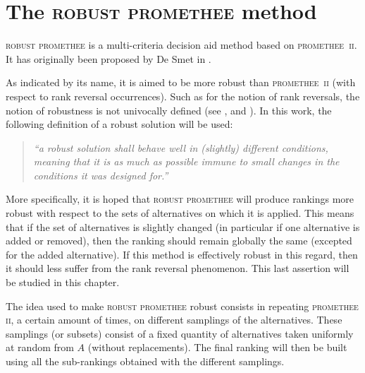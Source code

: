 \chapter{The \textsc{robust promethee} method} \label{sec:Robust_Promethee}
\label{chap:robst}

\begin{sloppypar}
\textsc{robust promethee} is a multi-criteria decision aid method based on \mbox{\textsc{promethee ii}}.
It has originally been proposed by De Smet in \cite{RobPII}.
\end{sloppypar}


As indicated by its name, it is aimed to be more robust than \mbox{\textsc{promethee ii}} (with respect to rank reversal occurrences). 
Such as for the notion of rank reversals, the notion of robustness is not univocally defined (see \cite{Roy2010629}, \cite{Hites2006322} and \cite{barrico2006robustness}).
In this work, the following definition of a robust solution will be used:
\begin{quote}
    \textit{
    ``a robust solution shall behave well in (slightly) different conditions, meaning that it is as much as possible immune to small changes in the conditions it was designed for.''} \cite{barrico2006robustness}
\end{quote}

More specifically, it is hoped that \textsc{robust promethee} will produce rankings more robust with respect to the sets of alternatives on which it is applied.
This means that if the set of alternatives is slightly changed (in particular if one alternative is added or removed), then the ranking should remain globally the same (excepted for the added alternative).
If this method is effectively robust in this regard, then it should less suffer from the rank reversal phenomenon. 
This last assertion will be studied in this chapter.

The idea used to make \textsc{robust promethee} robust consists in repeating \textsc{promethee ii}, a certain amount of times, on different samplings of the alternatives. 
These samplings (or subsets) consist of a fixed quantity of alternatives taken uniformly at random from $A$ (without replacements). The final ranking will then be built using all the sub-rankings obtained with the different samplings. 

